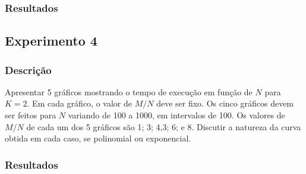 	\subsubsection{Resultados}

\subsection{Experimento 4} 
	\subsubsection{Descrição}
		Apresentar 5 gráficos mostrando o tempo de execução em função de $N$ para $K = 2$. Em cada gráfico, o valor de $M / N$ deve ser fixo. Os cinco gráficos devem ser feitos para $N$ variando de 100 a 1000, em intervalos de 100. Os valores de $M / N$ de cada um dos 5 gráficos são 1; 3; 4,3; 6; e 8. Discutir a natureza da curva obtida em cada caso, se polinomial ou exponencial.
	
	\subsubsection{Resultados}

\clearpage 
